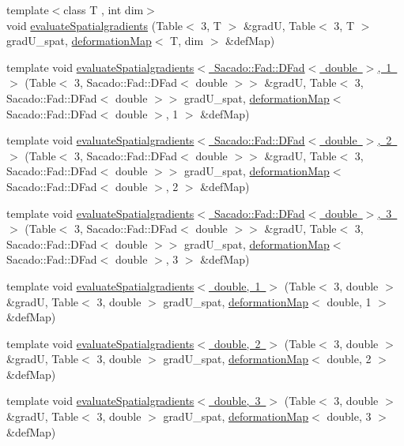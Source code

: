 \begin{DoxyCompactItemize}
\item 
{\footnotesize template$<$class T , int dim$>$ }\\void \mbox{\hyperlink{group___evaluation_functions_ga0b976342d491f6215953e2e65ea6a0de}{evaluate\+Spatialgradients}} (Table$<$ 3, T $>$ \&gradU, Table$<$ 3, T $>$ grad\+U\+\_\+spat, \mbox{\hyperlink{structdeformation_map}{deformation\+Map}}$<$ T, dim $>$ \&def\+Map)
\item 
template void \mbox{\hyperlink{function_evaluations_8cc_a31257b0c4b710fb48bf0b70e7b262da9}{evaluate\+Spatialgradients$<$ Sacado\+::\+Fad\+::\+D\+Fad$<$ double $>$, 1 $>$}} (Table$<$ 3, Sacado\+::\+Fad\+::\+D\+Fad$<$ double $>$$>$ \&gradU, Table$<$ 3, Sacado\+::\+Fad\+::\+D\+Fad$<$ double $>$$>$ grad\+U\+\_\+spat, \mbox{\hyperlink{structdeformation_map}{deformation\+Map}}$<$ Sacado\+::\+Fad\+::\+D\+Fad$<$ double $>$, 1 $>$ \&def\+Map)
\item 
template void \mbox{\hyperlink{function_evaluations_8cc_ab89d365bd9b7a2124796e27f59a3b190}{evaluate\+Spatialgradients$<$ Sacado\+::\+Fad\+::\+D\+Fad$<$ double $>$, 2 $>$}} (Table$<$ 3, Sacado\+::\+Fad\+::\+D\+Fad$<$ double $>$$>$ \&gradU, Table$<$ 3, Sacado\+::\+Fad\+::\+D\+Fad$<$ double $>$$>$ grad\+U\+\_\+spat, \mbox{\hyperlink{structdeformation_map}{deformation\+Map}}$<$ Sacado\+::\+Fad\+::\+D\+Fad$<$ double $>$, 2 $>$ \&def\+Map)
\item 
template void \mbox{\hyperlink{function_evaluations_8cc_a343650e4cd1050b8776d2fec5dfc1804}{evaluate\+Spatialgradients$<$ Sacado\+::\+Fad\+::\+D\+Fad$<$ double $>$, 3 $>$}} (Table$<$ 3, Sacado\+::\+Fad\+::\+D\+Fad$<$ double $>$$>$ \&gradU, Table$<$ 3, Sacado\+::\+Fad\+::\+D\+Fad$<$ double $>$$>$ grad\+U\+\_\+spat, \mbox{\hyperlink{structdeformation_map}{deformation\+Map}}$<$ Sacado\+::\+Fad\+::\+D\+Fad$<$ double $>$, 3 $>$ \&def\+Map)
\item 
template void \mbox{\hyperlink{function_evaluations_8cc_a688e887a593bf0c3effebec8495fb849}{evaluate\+Spatialgradients$<$ double, 1 $>$}} (Table$<$ 3, double $>$ \&gradU, Table$<$ 3, double $>$ grad\+U\+\_\+spat, \mbox{\hyperlink{structdeformation_map}{deformation\+Map}}$<$ double, 1 $>$ \&def\+Map)
\item 
template void \mbox{\hyperlink{function_evaluations_8cc_a3f479e2f2e28603def984ea4c2e02ad9}{evaluate\+Spatialgradients$<$ double, 2 $>$}} (Table$<$ 3, double $>$ \&gradU, Table$<$ 3, double $>$ grad\+U\+\_\+spat, \mbox{\hyperlink{structdeformation_map}{deformation\+Map}}$<$ double, 2 $>$ \&def\+Map)
\item 
template void \mbox{\hyperlink{function_evaluations_8cc_a9c17d7db3f0ade6c01cfb5450b958efc}{evaluate\+Spatialgradients$<$ double, 3 $>$}} (Table$<$ 3, double $>$ \&gradU, Table$<$ 3, double $>$ grad\+U\+\_\+spat, \mbox{\hyperlink{structdeformation_map}{deformation\+Map}}$<$ double, 3 $>$ \&def\+Map)
\end{DoxyCompactItemize}


